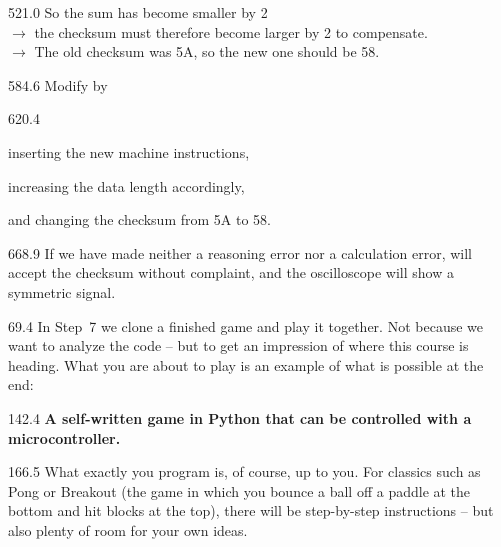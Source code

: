\documentclass{aslab}
\begin{document}
\begin{region}[pitch=13.3]{521.0}
So the sum has become smaller by 2\\
$\rightarrow$ the checksum must therefore become larger by 2 to compensate.\\
$\rightarrow$ The old checksum was 5A, so the new one should be 58.
\end{region}

\begin{region}{584.6}
\blank
Modify  by
\end{region}

\begin{region}{620.4}
\begin{dashlist}
\item inserting the new machine instructions,
\item increasing the data length accordingly,
\item and changing the checksum from 5A to 58.
\end{dashlist}
\end{region}

\begin{region}{668.9}
If we have made neither a reasoning error nor a calculation error,
 will accept the checksum without complaint, and the
oscilloscope will show a symmetric signal.
\end{region}

\nextpage
\begin{region}{69.4}
\blank
In Step~7 we clone a finished game and play it together. Not because we
want to analyze the code -- but to get an impression of where this course is
heading. What you are about to play is an example of what is possible at
the end:
\end{region}

\begin{region}{142.4}
\textbf{A self-written game in Python that can be controlled with a
microcontroller.}
\end{region}

\begin{region}{166.5}
What exactly you program is, of course, up to you. For classics such as
Pong or Breakout (the game in which you bounce a ball off a paddle at the
bottom and hit blocks at the top), there will be step-by-step instructions
-- but also plenty of room for your own ideas.
\end{region}
\end{document}
